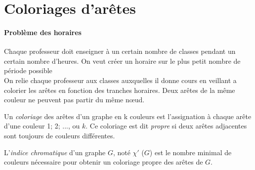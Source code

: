 \section{Coloriages d'arêtes}

\paragraph{Problème des horaires}
Chaque professeur doit enseigner à un certain nombre de classes pendant un certain nombre d'heures. On veut créer
un horaire sur le plus petit nombre de période possible
\\On relie chaque professeur aux classes auxquelles il donne cours en veillant a colorier les arêtes en fonction des tranches horaires. Deux arêtes de la même couleur ne peuvent pas partir du même nœud. 

\begin{mydef}
  Un \emph{coloriage} des arêtes d’un graphe en k couleurs est l’assignation à chaque arête d’une couleur 1; 2; ..., ou $k$. Ce coloriage est dit \emph{propre} si deux arêtes adjacentes sont toujours de couleurs différentes.
\end{mydef}

\begin{mydef}
  L’\emph{indice chromatique} d’un graphe $G$, noté $\chi '$ ($G$) est le nombre minimal de couleurs nécessaire pour obtenir un coloriage propre des arêtes de $G$.
\end{mydef}


